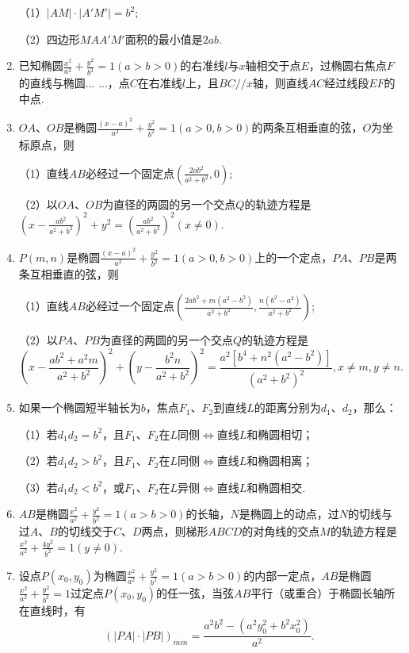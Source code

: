\documentclass{article}
\begin{document}
\begin{enumerate}[label=\arabic*.]
（1）$\left|AM\right|\cdot\left|A'M'\right|=b^2$;

（2）四边形$MAA'M'$面积的最小值是$2ab$. 

\item 已知椭圆$\frac{x^2}{a^2} + \frac{y^2}{b^2} = 1 \left(a > b > 0\right)$的右准线$l$与$x$轴相交于点$E$，过椭圆右焦点$F$的直线与椭圆... ...，点$C$在右准线$l$上，且$BC//x$轴，则直线$AC$经过线段$EF$的中点. 

\item $OA$、$OB$是椭圆$\frac{(x-a)^2}{a^2} + \frac{y^2}{b^2} = 1 \left(a >0, b > 0\right)$的两条互相垂直的弦，$O$为坐标原点，则

（1）直线$AB$必经过一个固定点$(\frac{2ab^2}{a^2+b^2},0)$;

（2）以$OA$、$OB$为直径的两圆的另一个交点$Q$的轨迹方程是
$\left(x-\frac{ab^2}{a^2+b^2}\right)^2 + y^2 = \left(\frac{ab^2}{a^2+b^2}\right)^2\left(x\neq 0\right)$. 

\item $P(m,n)$是椭圆$\frac{(x-a)^2}{a^2} + \frac{y^2}{b^2} = 1 \left(a >0, b > 0\right)$上的一个定点，$PA$、$PB$是两条互相垂直的弦，则

（1）直线$AB$必经过一个固定点$(\frac{2ab^2+m\left(a^2-b^2\right)}{a^2+b^2},\frac{n\left(b^2-a^2\right)}{a^2+b^2})$;

（2）以$PA$、$PB$为直径的两圆的另一个交点$Q$的轨迹方程是
$$\left(x - \frac{ab^2+a^2m}{a^2+b^2}\right)^2 + \left(y-\frac{b^2n}{a^2+b^2}\right)^2 = \frac{a^2\left[b^4 +n^2\left(a^2-b^2\right)\right]}{\left(a^2+b^2\right)^2},x\neq m, y\neq n.$$ 

\item 如果一个椭圆短半轴长为$b$，焦点$F_1$、$F_2$到直线$L$的距离分别为$d_1$、$d_2$，那么：

（1）若$d_1d_2=b^2$，且$F_1$、$F_2$在$L$同侧$\Leftrightarrow$直线$L$和椭圆相切；

（2）若$d_1d_2>b^2$，且$F_1$、$F_2$在$L$同侧$\Leftrightarrow$直线$L$和椭圆相离；

（3）若$d_1d_2<b^2$，或$F_1$、$F_2$在$L$异侧$\Leftrightarrow$直线$L$和椭圆相交. 

\item $AB$是椭圆$\frac{x^2}{a^2} + \frac{y^2}{b^2} = 1 \left(a > b > 0\right)$的长轴，$N$是椭圆上的动点，过$N$的切线与过$A$、$B$的切线交于$C$、$D$两点，则梯形$ABCD$的对角线的交点$M$的轨迹方程是$\frac{x^2}{a^2} + \frac{4y^2}{b^2} = 1\left(y\neq 0\right)$. 

\item 设点$P(x_0,y_0)$为椭圆$\frac{x^2}{a^2} + \frac{y^2}{b^2} = 1 \left(a > b > 0\right)$的内部一定点，$AB$是椭圆$\frac{x^2}{a^2} + \frac{y^2}{b^2} = 1$过定点$P(x_0,y_0)$的任一弦，当弦$AB$平行（或重合）于椭圆长轴所在直线时，有$$\left(\left|PA \right|\cdot\left|PB\right|\right)_{min} = \frac{a^2b^2 - \left(a^2y_0^2 + b^2x_0^2\right)}{a^2}. $$


\end{enumerate}
\end{document}
